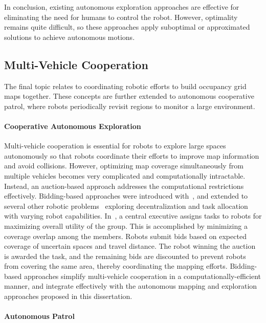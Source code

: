 In conclusion, existing autonomous exploration approaches are effective for eliminating the need for humans to control the robot. However, optimality remains quite difficult, so these approaches apply suboptimal or approximated solutions to achieve autonomous motions.


\subsection{Multi-Vehicle Cooperation}

The final topic relates to coordinating robotic efforts to build occupancy grid maps together. These concepts are further extended to autonomous cooperative patrol, where robots periodically revisit regions to monitor a large environment.

\paragraph{Cooperative Autonomous Exploration}

Multi-vehicle cooperation is essential for robots to explore large spaces autonomously so that robots coordinate their efforts to improve map information and avoid collisions. However, optimizing map coverage simultaneously from multiple vehicles becomes very complicated and computationally intractable. Instead, an auction-based approach addresses the computational restrictions effectively. Bidding-based approaches were introduced with~\cite{SimApfBurFoxMooThrYou00,DiaSte00}, and extended to several other robotic problems~\cite{GerMaj02,ZloSteDiaTha02,SarBal05,ChoBruHow09} exploring decentralization and task allocation with varying robot capabilities. In~\cite{SimApfBurFoxMooThrYou00}, a central executive assigns tasks to robots for maximizing overall utility of the group. This is accomplished by minimizing a coverage overlap among the members. Robots submit bids based on expected coverage of uncertain spaces and travel distance. The robot winning the auction is awarded the task, and the remaining bids are discounted to prevent robots from covering the same area, thereby coordinating the mapping efforts. Bidding-based approaches simplify multi-vehicle cooperation in a computationally-efficient manner, and integrate effectively with the autonomous mapping and exploration approaches proposed in this dissertation. 

\paragraph{Autonomous Patrol}

